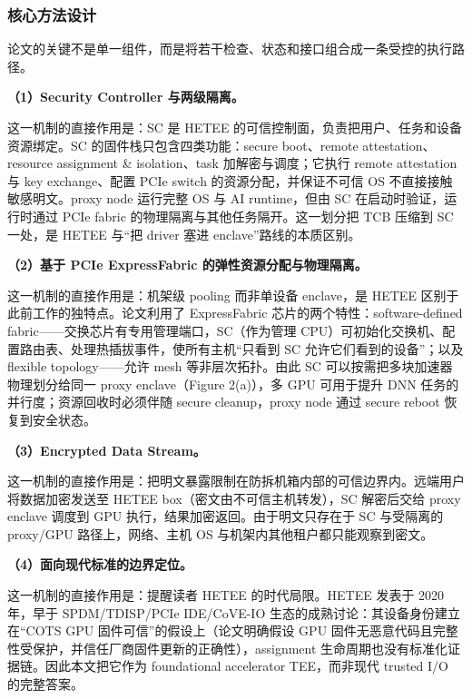 \documentclass[11pt]{ctexart}
\begin{document}
\subsubsection{核心方法设计}
论文的关键不是单一组件，而是将若干检查、状态和接口组合成一条受控的执行路径。\par
\noindent\textbf{（1）Security Controller 与两级隔离。}\par
这一机制的直接作用是：SC 是 HETEE 的可信控制面，负责把用户、任务和设备资源绑定。SC 的固件栈只包含四类功能：secure boot、remote attestation、resource assignment \& isolation、task 加解密与调度；它执行 remote attestation 与 key exchange、配置 PCIe switch 的资源分配，并保证不可信 OS 不直接接触敏感明文。proxy node 运行完整 OS 与 AI runtime，但由 SC 在启动时验证，运行时通过 PCIe fabric 的物理隔离与其他任务隔开。这一划分把 TCB 压缩到 SC 一处，是 HETEE 与``把 driver 塞进 enclave''路线的本质区别。\par
\noindent\textbf{（2）基于 PCIe ExpressFabric 的弹性资源分配与物理隔离。}\par
这一机制的直接作用是：机架级 pooling 而非单设备 enclave，是 HETEE 区别于此前工作的独特点。论文利用了 ExpressFabric 芯片的两个特性：software-defined fabric——交换芯片有专用管理端口，SC（作为管理 CPU）可初始化交换机、配置路由表、处理热插拔事件，使所有主机``只看到 SC 允许它们看到的设备''；以及 flexible topology——允许 mesh 等非层次拓扑。由此 SC 可以按需把多块加速器物理划分给同一 proxy enclave（Figure 2(a)），多 GPU 可用于提升 DNN 任务的并行度；资源回收时必须伴随 secure cleanup，proxy node 通过 secure reboot 恢复到安全状态。\par
\noindent\textbf{（3）Encrypted Data Stream。}\par
这一机制的直接作用是：把明文暴露限制在防拆机箱内部的可信边界内。远端用户将数据加密发送至 HETEE box（密文由不可信主机转发），SC 解密后交给 proxy enclave 调度到 GPU 执行，结果加密返回。由于明文只存在于 SC 与受隔离的 proxy/GPU 路径上，网络、主机 OS 与机架内其他租户都只能观察到密文。\par
\noindent\textbf{（4）面向现代标准的边界定位。}\par
这一机制的直接作用是：提醒读者 HETEE 的时代局限。HETEE 发表于 2020 年，早于 SPDM/TDISP/PCIe IDE/CoVE-IO 生态的成熟讨论：其设备身份建立在``COTS GPU 固件可信''的假设上（论文明确假设 GPU 固件无恶意代码且完整性受保护，并信任厂商固件更新的正确性），assignment 生命周期也没有标准化证据链。因此本文把它作为 foundational accelerator TEE，而非现代 trusted I/O 的完整答案。\par
\end{document}
